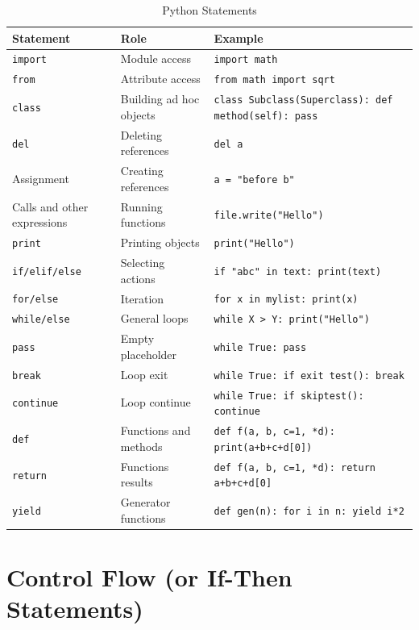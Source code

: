 \documentclass[a4paper,11pt]{book}
\begin{document}
\begin{table}
	\centering
	\caption{Python Statements}
	\label{tab:python_statements}
	\begin{tabular}{lll}
		\toprule \toprule
		Statement & Role & Example \\
		\midrule
		\texttt{import} & Module access & \texttt{import math} \\
		\texttt{from} & Attribute access & \texttt{from math import sqrt} \\
		\texttt{class} & Building ad hoc objects & \texttt{class Subclass(Superclass): def method(self): pass} \\
		\texttt{del} & Deleting references & \texttt{del a} \\
		Assignment & Creating references & \texttt{a = "before b"} \\ 
		Calls and other expressions & Running functions & \texttt{file.write("Hello")}\\
		\texttt{print} & Printing objects & \texttt{print("Hello")} \\ 
		\texttt{if/elif/else} & Selecting actions & \texttt{if "abc" in text: print(text)} \\ 
		\texttt{for/else} & Iteration & \texttt{for x in mylist: print(x)} \\
		\texttt{while/else} & General loops & \texttt{while X > Y: print("Hello")} \\ 
		\texttt{pass} & Empty placeholder & \texttt{while True: pass} \\  
		\texttt{break} &  Loop exit & \texttt{while True: if exit test(): break} \\ 
		\texttt{continue} & Loop continue & \texttt{while True: if skiptest(): continue} \\ 
		\texttt{def} & Functions and methods & \texttt{def f(a, b, c=1, *d): print(a+b+c+d[0])} \\ 
		\texttt{return} & Functions results & \texttt{def f(a, b, c=1, *d): return a+b+c+d[0]} \\ 
		\texttt{yield} & Generator functions & \texttt{def gen(n): for i in n: yield i*2} \\ 
		\bottomrule
	\end{tabular}
\end{table}
\clearpage

\section{Control Flow (or If-Then Statements)}
\label{sec§:control_flow}
\end{document}
